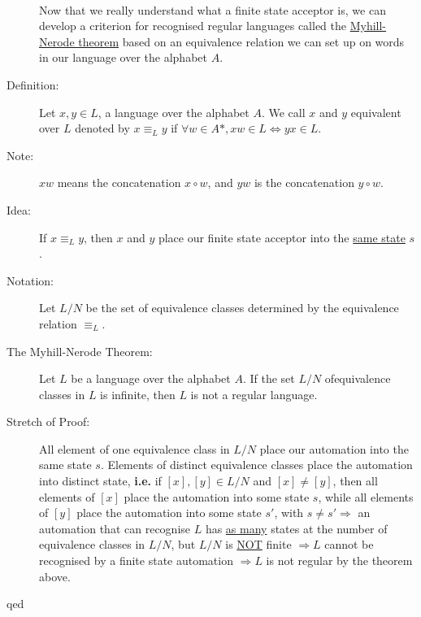 \documentclass[10pt]{article}
\begin{document}
\begin{description}
\begin{table}[h!]
		\end{table}
		~\\
		Now that we really understand what a finite state acceptor is, we can develop a criterion for recognised regular languages called the \underline{Myhill-Nerode theorem} based on an equivalence relation we can set up on words in our language over the alphabet $A$.
		\item[Definition:] Let $x, y \in L$, a language over the alphabet $A$. We call $x$ and $y$ equivalent over $L$ denoted by $x \equiv_L y$ if $\forall w \in A*, xw \in L \Leftrightarrow yx \in L$.
		\item[Note:] $xw$ means the concatenation $x \circ w$, and $yw$ is the concatenation $y \circ w$.
		\item[Idea:] If $x \equiv_L y$, then $x$ and $y$ place our finite state acceptor into the \underline{same state} $s$.
		\item[Notation:] Let $L/N$ be the set of equivalence classes determined by the equivalence relation $\equiv_L$.
		\item[The Myhill-Nerode Theorem:] Let $L$ be a language over the alphabet $A$. If the set $L/N$ ofequivalence classes in $L$ is infinite, then $L$ is not a regular language.
		\item[Stretch of Proof:] All element of one equivalence class in $L/N$ place our automation into the same state $s$. Elements of distinct equivalence classes place the automation into distinct state, \textbf{i.e.} if $[x], [y] \in L/N$ and $[x] \neq [y]$, then all elements of $[x]$ place the automation into some state $s$, while all elements of $[y]$ place the automation into some state $s'$, with $s \neq s' \Rightarrow$ an automation that can recognise $L$ has \underline{as many} states at the number of equivalence classes in $L/N$, but $L/N$ is \underline{NOT} finite $\Rightarrow L$ cannot be recognised by a finite state automation $\Rightarrow L$ is not regular by the theorem above.
		\item[qed]
	\end{description}
	
\end{document}
